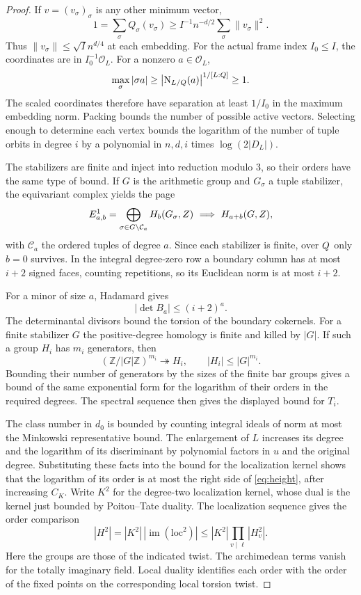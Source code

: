 \begin{proof}
If \(v=(v_\sigma)_\sigma\) is any other minimum vector,
\[
 1=\sum_\sigma Q_\sigma(v_\sigma)
    \ge I^{-1}n^{-d/2}\sum_\sigma \|v_\sigma\|^2 .
\]
Thus \(\|v_\sigma\|\le\sqrt I n^{d/4}\) at each embedding.
For the actual frame index \(I_0\le I\), the coordinates
are in \(I_0^{-1}\mathcal O_L\). For a nonzero \(a\in\mathcal O_L\),
\[
    \max_\sigma |\sigma a|
      \ge \bigl|\operatorname N_{L/Q}(a)\bigr|^{1/[L:Q]}\ge1 .
\]
The scaled coordinates therefore have separation at least \(1/I_0\)
in the maximum embedding norm. Packing bounds the number of
possible active vectors. Selecting enough to determine
each vertex bounds the logarithm of the number of
tuple orbits in degree \(i\) by a polynomial in
\(n,d,i\) times \(\log(2|D_L|)\).

The stabilizers are finite and inject into reduction
modulo \(3\), so their orders have the same type of
bound. If \(G\) is the arithmetic group and \(G_\sigma\) a
tuple stabilizer, the equivariant complex yields the page
\[
 E^1_{a,b}=\bigoplus_{\sigma\in G\backslash\mathcal C_a}
                   H_b(G_\sigma,Z)
 \ \Longrightarrow\ H_{a+b}(G,Z),
\]
with \(\mathcal C_a\) the ordered tuples of degree \(a\).
Since each stabilizer is finite, over \(Q\) only \(b=0\)
survives. In the integral degree-zero row a boundary column has at most
\(i+2\) signed faces, counting repetitions, so its Euclidean norm
is at most \(i+2\).

For a minor of size \(a\), Hadamard gives
\[
                         |\det B_a|\le(i+2)^a .
\]
The determinantal divisors bound the torsion of the boundary
cokernels. For a finite stabilizer \(G\) the positive-degree homology is finite and killed by \(|G|\). If such a group \(H_i\) has \(m_i\) generators, then
\[
 (\mathbb Z/|G|\mathbb Z)^{m_i}\twoheadrightarrow H_i,\qquad |H_i|\le |G|^{m_i}.
\]
Bounding their
number of generators by the sizes of the finite bar
groups gives a bound of the same exponential form
for the logarithm of their orders in the required
degrees. The spectral sequence then gives the
displayed bound for \(T_i\).
\label{cor:cohomology-height-3}

The class number in \(d_0\) is bounded by counting integral
ideals of norm at most the Minkowski representative
bound. The enlargement of \(L\) increases its degree and
the logarithm of its discriminant by polynomial factors
in \(u\) and the original degree. Substituting these facts
into the bound for the localization kernel shows that
the logarithm of its order is at most the right side
of \eqref{eq:height}, after increasing \(C_K\).
Write \(K^2\) for the degree-two localization kernel, whose dual is the kernel just bounded by Poitou--Tate duality. The localization sequence gives the order comparison
\[
 |H^2|=|K^2|\,|\operatorname{im}(\mathrm{loc}^2)|
       \le |K^2|\prod_{v\mid\ell}|H^2_v| .
\]
Here the groups are those of the indicated twist. The archimedean terms vanish for the totally imaginary field. Local duality
identifies each order with the order of the fixed
points on the corresponding local torsion twist.


\end{proof}
